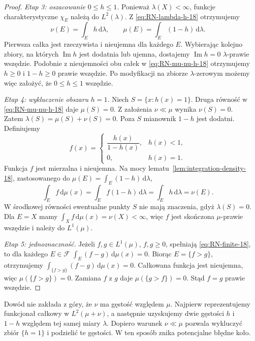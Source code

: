 \begin{proof}
\emph{Etap 3: oszacowanie $0\le h\le1$.}
Ponieważ $\lambda(X)<\infty$, funkcje charakterystyczne $\chi_E$
należą do $L^2(\lambda)$. Z \eqref{eq:RN-lambda-h-18}
otrzymujemy
\begin{equation}\label{eq:RN-mu-nu-h-18}
\nu(E)=\int_Eh\,\mathrm d\lambda,\qquad
\mu(E)=\int_E(1-h)\,\mathrm d\lambda.
\end{equation}
Pierwsza całka jest rzeczywista i nieujemna dla
każdego $E$. Wybierając kolejno zbiory, na których
$\operatorname{Im}h$ jest dodatnia lub ujemna,
dostajemy $\operatorname{Im}h=0$ $\lambda$-prawie wszędzie.
Podobnie z nieujemności obu całek w
\eqref{eq:RN-mu-nu-h-18} otrzymujemy
$h\ge0$ i $1-h\ge0$ prawie wszędzie.
Po modyfikacji na zbiorze $\lambda$-zerowym możemy
więc założyć, że $0\le h\le1$ wszędzie.

\emph{Etap 4: wykluczenie obszaru $h=1$.}
Niech $S=\{x:h(x)=1\}$. Druga równość
w \eqref{eq:RN-mu-nu-h-18} daje $\mu(S)=0$.
Z założenia $\nu\ll\mu$ wynika $\nu(S)=0$.
Zatem $\lambda(S)=\mu(S)+\nu(S)=0$.
Poza $S$ mianownik $1-h$ jest dodatni.
Definiujemy
\[
f(x)=\begin{cases}
\dfrac{h(x)}{1-h(x)},&h(x)<1,\\[4pt]
0,&h(x)=1.
\end{cases}
\]
Funkcja $f$ jest mierzalna i nieujemna. Na mocy
lematu~\ref{lem:integration-density-18}, zastosowanego
do $\mu(E)=\int_E(1-h)\,\mathrm d\lambda$,
\[
\int_E f\,\mathrm d\mu(x)
 =\int_E f(1-h)\,\mathrm d\lambda
 =\int_Eh\,\mathrm d\lambda
 =\nu(E).
\]
W środkowej równości ewentualne punkty $S$ nie
mają znaczenia, gdyż $\lambda(S)=0$.
Dla $E=X$ mamy $\int_Xf\,\mathrm d\mu(x)=\nu(X)<\infty$,
więc $f$ jest skończona $\mu$-prawie wszędzie
i należy do $L^1(\mu)$.

\emph{Etap 5: jednoznaczność.}
Jeżeli $f,g\in L^1(\mu)$, $f,g\ge0$, spełniają
\eqref{eq:RN-finite-18}, to dla każdego $E\in\mathcal F$
$\int_E(f-g)\,\mathrm d\mu(x)=0$.
Biorąc $E=\{f>g\}$, otrzymujemy
$\int_{\{f>g\}}(f-g)\,\mathrm d\mu(x)=0$.
Całkowana funkcja jest nieujemna, więc
$\mu(\{f>g\})=0$. Zamiana $f$ z $g$ daje
$\mu(\{g>f\})=0$. Stąd $f=g$ prawie wszędzie.
\end{proof}

\begin{uwaga}[Rola pomocniczej miary $\lambda=\mu+\nu$]
Dowód nie zakłada z góry, że $\nu$ ma gęstość względem
$\mu$. Najpierw reprezentujemy funkcjonał całkowy w
$L^2(\mu+\nu)$, a następnie uzyskujemy dwie gęstości
$h$ i $1-h$ względem tej samej miary $\lambda$.
Dopiero warunek $\nu\ll\mu$ pozwala wykluczyć
zbiór $\{h=1\}$ i podzielić te gęstości.
W ten sposób znika potencjalne błędne koło.
\end{uwaga}

